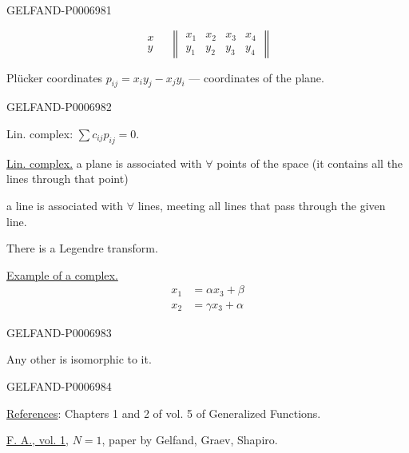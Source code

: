 \begin{GelfandAdjacentEvidence}{GELFAND-P000698}{1}

\[
\begin{array}{c}x\\y\end{array}
\quad
\begin{Vmatrix}
x_1 & x_2 & x_3 & x_4\\
y_1 & y_2 & y_3 & y_4
\end{Vmatrix}
\]

Plücker coordinates \(p_{ij}=x_i y_j-x_j y_i\) --- coordinates of the plane.
\end{GelfandAdjacentEvidence}
\begin{GelfandAdjacentEvidence}{GELFAND-P000698}{2}


Lin. complex: \(\sum c_{ij}p_{ij}=0\).

\underline{Lin. complex.}
a plane is associated with \(\forall\) points of the space (it contains all the lines through that point)

a line is associated with \(\forall\) lines, meeting all lines that pass through the given line.

There is a Legendre transform.

\underline{Example of a complex.}
\[
\begin{aligned}
x_1&=\alpha x_3+\beta\\
x_2&=\gamma x_3+\alpha
\end{aligned}
\]
\end{GelfandAdjacentEvidence}
\begin{GelfandAdjacentEvidence}{GELFAND-P000698}{3}


Any other is isomorphic to it.
\end{GelfandAdjacentEvidence}
\begin{GelfandAdjacentEvidence}{GELFAND-P000698}{4}


\underline{References}: Chapters 1 and 2 of vol. 5 of Generalized Functions.

\href{https://www.mathnet.ru/eng/faa2803}{F. A., vol. 1}, \(N=1\), paper by Gelfand, Graev, Shapiro.
\end{GelfandAdjacentEvidence}



